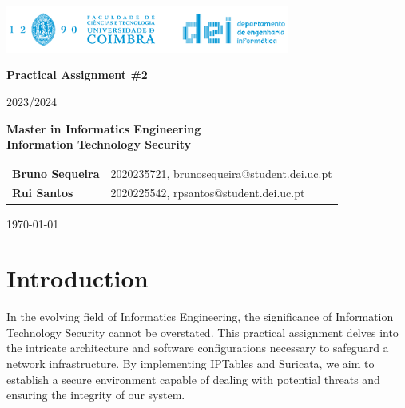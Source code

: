 \documentclass{article}
\begin{document}
\begin{titlepage}

        \centering
    \vspace*{1cm}

    \includegraphics[width=0.7\textwidth]{dei_thumb.png} %

    \vspace{1.5cm}
    {\LARGE \textbf{Practical Assignment \#2
} \par}
    \vspace{0.5cm}
    {\Large 2023/2024\par}

    \vspace{2.5cm}
    \textbf{Master in Informatics Engineering} \\
    \textbf{Information Technology Security} \par
    \vspace{2cm}
    \vspace{6cm}
    \begin{tabular}{ll}
        \textbf{Bruno Sequeira} & 2020235721, brunosequeira@student.dei.uc.pt \\
        \textbf{Rui Santos} & 2020225542, rpsantos@student.dei.uc.pt
        \\
    \end{tabular}

        
    \vfill
    {\large \today \par}
    \clearpage
    \tableofcontents
    \clearpage
    
\end{titlepage}



\section{Introduction}
\quad In the evolving field of Informatics Engineering, the significance of Information Technology Security cannot be overstated. This practical assignment delves into the intricate architecture and software configurations necessary to safeguard a network infrastructure. By implementing IPTables and Suricata, we aim to establish a secure environment capable of dealing with potential threats and ensuring the integrity of our system.
\end{document}
